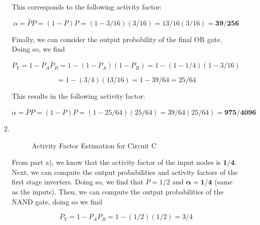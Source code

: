 \documentclass[fleqn]{article}
\begin{document}
\begin{enumerate}
\begin{enumerate}
			This corresponds to the following activity factor:
			
			\begin{equation*}
				\alpha = \bar{P}P = (1 - P)P = (1 - 3/16)(3/16) = 13/16(3/16) = \mathbf{39/256}
			\end{equation*}
			
			Finally, we can consider the output probability of the final OR gate. Doing so, we find
			
			\begin{equation*}
				P_Y = 1 - \bar{P}_A\bar{P}_B = 1 - (1 - P_A)(1 - P_B) = 1 - (1 - 1/4)(1 - 3/16) 
			\end{equation*}
			
			\begin{equation*}
				= 1 - (3/4)(13/16) = 1 - 39/64 = 25/64
			\end{equation*}
			
			This results in the following activity factor:
			
			\begin{equation*}
				\alpha = \bar{P}P = (1 - P)P = (1 - 25/64)(25/64) = 39/64(25/64) = \mathbf{975/4096}
			\end{equation*}
			
			\item ~
			
			\begin{figure}[H]				
				\centerline{}
				\caption{Activity Factor Estimation for Circuit C}
				\label{fig::activity_factor_c}
			\end{figure}
			
			From part a), we know that the activity factor of the input nodes is $\mathbf{1/4}$. Next, we can compute the output probabilities and activity factors of the first stage inverters. Doing so, we find that $P = 1/2$ and $\mathbf{\alpha = 1/4}$ (same as the inputs). Then, we can compute the output probabilities of the NAND gate, doing so we find

			\begin{equation*}
				P_Y = 1 - P_AP_B = 1 - (1/2)(1/2) = 3/4
			\end{equation*}
			

\end{enumerate}
\end{enumerate}
\end{document}
